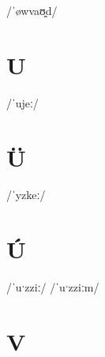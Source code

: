 \documentclass[10pt,a4paper,twoside]{book}
\begin{document}
\begin{multicols}{3}
 {/ˈøwvaʊ̯d/} {}
\end{multicols}

\section*{U}

\begin{multicols}{3}
 {/ˈujeː/} {}
\end{multicols}

\section*{Ü}

\begin{multicols}{3}
 {/ˈyzkeː/} {}
\end{multicols}

\section*{Ú}

\begin{multicols}{3}
 {/ˈuˑzziː/} {}
 {/ˈuˑzziːm/} {}
\end{multicols}

\section*{V}
\end{document}
